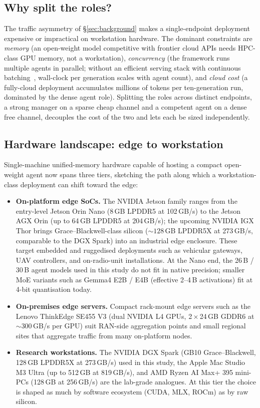 \documentclass[journal]{IEEEtran}
\begin{document}
\subsection{Why split the roles?}
\label{sec:asymmetry}

The traffic asymmetry of \S\ref{sec:background} makes a single-endpoint deployment expensive or impractical on workstation hardware. The dominant constraints are \emph{memory} (an open-weight model competitive with frontier cloud APIs needs HPC-class GPU memory, not a workstation), \emph{concurrency} (the framework runs multiple agents in parallel; without an efficient serving stack with continuous batching~\cite{yu2022orca, kwon2023vllm}, wall-clock per generation scales with agent count), and \emph{cloud cost} (a fully-cloud deployment accumulates millions of tokens per ten-generation run, dominated by the dense agent role). Splitting the roles across distinct endpoints, a strong manager on a sparse cheap channel and a competent agent on a dense free channel, decouples the cost of the two and lets each be sized independently.

\subsection{Hardware landscape: edge to workstation}
\label{sec:hwlandscape}

Single-machine unified-memory hardware capable of hosting a compact open-weight agent now spans three tiers, sketching the path along which a workstation-class deployment can shift toward the edge:

\begin{itemize}
    \item \textbf{On-platform edge SoCs.} The NVIDIA Jetson family ranges from the entry-level Jetson Orin Nano (8\,GB LPDDR5 at 102\,GB/s) to the Jetson AGX Orin (up to 64\,GB LPDDR5 at 204\,GB/s); the upcoming NVIDIA IGX Thor brings Grace--Blackwell-class silicon (${\sim}128$\,GB LPDDR5X at 273\,GB/s, comparable to the DGX Spark) into an industrial edge enclosure. These target embedded and ruggedised deployments such as vehicular gateways, UAV controllers, and on-radio-unit installations. At the Nano end, the 26\,B / 30\,B agent models used in this study do not fit in native precision; smaller MoE variants such as Gemma4 E2B / E4B (effective 2--4\,B activations) fit at 4-bit quantisation today.
    \item \textbf{On-premises edge servers.} Compact rack-mount edge servers such as the Lenovo ThinkEdge SE455 V3 (dual NVIDIA L4 GPUs, 2\,$\times$\,24\,GB GDDR6 at ${\sim}300$\,GB/s per GPU) suit RAN-side aggregation points and small regional sites that aggregate traffic from many on-platform nodes.
    \item \textbf{Research workstations.} The NVIDIA DGX Spark (GB10 Grace--Blackwell, 128\,GB LPDDR5X at 273\,GB/s) used in this study, the Apple Mac Studio M3 Ultra (up to 512\,GB at 819\,GB/s), and AMD Ryzen AI Max+ 395 mini-PCs (128\,GB at 256\,GB/s) are the lab-grade analogues. At this tier the choice is shaped as much by software ecosystem (CUDA, MLX, ROCm) as by raw silicon.
\end{itemize}
\end{document}
